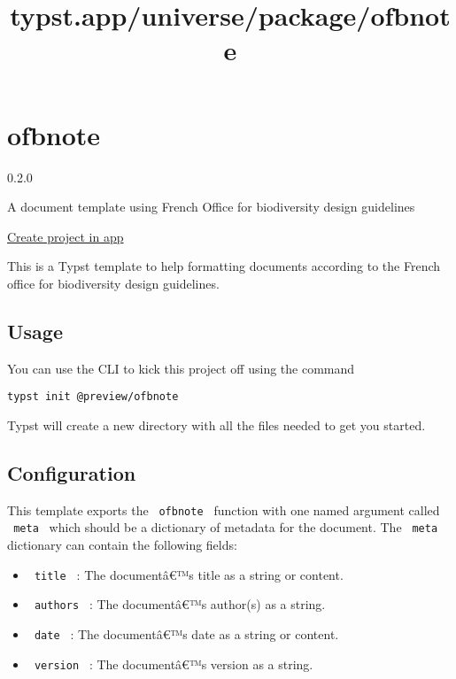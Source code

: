 \title{typst.app/universe/package/ofbnote}

\label{banner}
\label{template-thumbnail}

\section{ofbnote}\label{ofbnote}

{ 0.2.0 }

A document template using French Office for biodiversity design
guidelines

\href{/app?template=ofbnote&version=0.2.0}{Create project in app}

\label{readme}
This is a Typst template to help formatting documents according to the
French office for biodiversity design guidelines.

\subsection{Usage}\label{usage}

You can use the CLI to kick this project off using the command

\begin{verbatim}
typst init @preview/ofbnote
\end{verbatim}

Typst will create a new directory with all the files needed to get you
started.

\subsection{Configuration}\label{configuration}

This template exports the \texttt{\ ofbnote\ } function with one named
argument called \texttt{\ meta\ } which should be a dictionary of
metadata for the document. The \texttt{\ meta\ } dictionary can contain
the following fields:

\begin{itemize}
\tightlist
\item
  \texttt{\ title\ } : The documentâ€™s title as a string or content.
\item
  \texttt{\ authors\ } : The documentâ€™s author(s) as a string.
\item
  \texttt{\ date\ } : The documentâ€™s date as a string or content.
\item
  \texttt{\ version\ } : The documentâ€™s version as a string.
\end{itemize}

